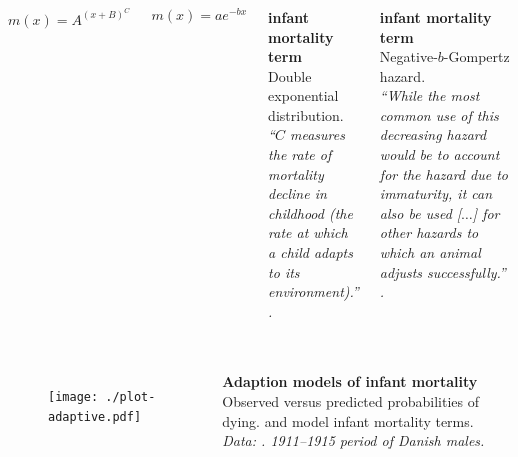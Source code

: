 \documentclass{beamer}
\begin{document}
\begin{frame}
\frametitle{\insertsection}

\begin{columns}[c]

\begin{equation*}
m(x) = A^{(x + B)^C}
\end{equation*}

\bigskip

\begin{equation*}
m(x) = ae^{-bx}
\end{equation*}

\footnotesize\textbf{\citeauthor{Heligman1980} infant mortality term}\\ Double exponential distribution. \\
\emph{\enquote{$C$ measures the rate of mortality decline in childhood (the rate at which a child adapts to its environment).}} \\ \scriptsize\emph{\cite{Heligman1980}.}

\medskip

\footnotesize\textbf{\citeauthor{Siler1979} infant mortality term}\\ Negative-$b$-Gompertz hazard. \\
\emph{\enquote{While the most common use of this decreasing hazard would be to account for the hazard due to immaturity, it can also be used [$\ldots$] for other hazards to which an animal adjusts successfully.}}
\\ \scriptsize\emph{\cite{Siler1979}.}

\end{columns}

\end{frame}

%

\begin{frame}
\frametitle{\insertsection}

\begin{columns}[c]

\begin{figure}[htb!]
\texttt{[image: ./plot-adaptive.pdf]}\\
\end{figure}

\footnotesize\textbf{Adaption models of infant mortality}\\ Observed versus predicted probabilities of dying. \cite{Heligman1980} and \cite{Siler1979} model infant mortality terms. \\ \scriptsize\emph{Data: \cite{Danmark1920}. 1911--1915 period of Danish males.}

\end{columns}

\end{frame}
\end{document}
